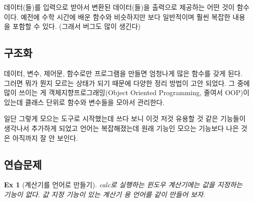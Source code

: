\documentclass{article}
\theoremstyle{plain}
\newtheorem{ex}{Ex}[section]
\theoremstyle{definition}
\theoremstyle{remark}
\begin{document}
데이터(들)를 입력으로 받아서 변환된 데이터(들)을 출력으로 제공하는 어떤 것이 함수이다. 
예전에 수학 시간에 배운 함수와 비슷하지만 보다 일반적이며 훨씬 복잡한 내용을 포함할 수 있다. 
(그래서 버그도 많이 생긴다)  

\subsection{구조화}

데이터, 변수, 제어문, 함수로만 프로그램을 만들면 엄청나게 많은 함수를 갖게 된다. 
그러면 뭐가 뭔지 모르는 상태가 되기 때문에 다양한 정리 방법이 고안 되었다. 
그 중에 많이 쓰이는 게 객체지향프로그래밍(Object Oriented Programming, 줄여서 OOP)이 있는데 
클래스 단위로 함수와 변수들을 모아서 관리한다. 

일단 그렇게 모으는 도구로 시작했는데 쓰다 보니 이것 저것 유용할 것 같은 기능들이 생각나서 
추가하게 되었고 언어는 복잡해졌는데 원래 기능인 모으는 기능보다 나은 것은 아직까지 잘 안 보인다. 

\subsection{연습문제}

\begin{ex}[계산기를 언어로 만들기]
calc로 실행하는 윈도우 계산기에는 값을 지정하는 기능이 없다. 
값 지정 기능이 있는 계산기 용 언어를 같이 만들어 보자.
\end{ex}
\end{document}
